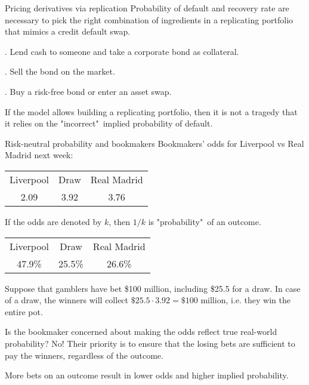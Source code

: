 \documentclass{beamer}
\begin{document}
\begin{frame}{Pricing derivatives via replication}
\justify
Probability of default and recovery rate are necessary to pick the right combination of ingredients in a replicating portfolio that mimics a credit default swap.

. Lend cash to someone and take a corporate bond as collateral.

. Sell the bond on the market.

. Buy a risk-free bond or enter an asset swap.

\justify
If the model allows building a replicating portfolio, then it is not a tragedy that it relies on the "incorrect"\ implied probability of default.
\end{frame}



\begin{frame}{Risk-neutral probability and bookmakers}
\justify
Bookmakers' odds for Liverpool vs Real Madrid next week:

\centering
\begin{tabular}{c|c|c}
Liverpool & Draw & Real Madrid \\
2.09 & 3.92 & 3.76
\end{tabular}

\justify
If the odds are denoted by $k$, then $1/k$ is "probability"\ of an outcome.

\centering
\begin{tabular}{c|c|c}
Liverpool & Draw & Real Madrid \\
47.9\% & 25.5\% & 26.6\%
\end{tabular}

\justify
Suppose that gamblers have bet \$100 million, including \$25.5 for a draw. In case of a draw, the winners will collect $\$25.5 \cdot 3.92 = \$100$ million, i.e. they win the entire pot.

\justify
Is the bookmaker concerned about making the odds reflect true real-world probability? No! Their priority is to ensure that the losing bets are sufficient to pay the winners, regardless of the outcome.

\justify
More bets on an outcome result in lower odds and higher implied probability.
\end{frame}
\end{document}
